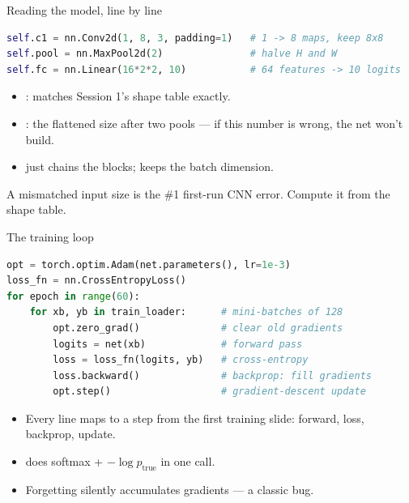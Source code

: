 \documentclass[10pt,aspectratio=169]{beamer}
\begin{document}
\begin{frame}[fragile]{Reading the model, line by line}
\begin{lstlisting}[language=Python]
self.c1 = nn.Conv2d(1, 8, 3, padding=1)   # 1 -> 8 maps, keep 8x8
self.pool = nn.MaxPool2d(2)               # halve H and W
self.fc = nn.Linear(16*2*2, 10)           # 64 features -> 10 logits
\end{lstlisting}
  \begin{itemize}
    \item {}: matches Session 1's shape table exactly.
    \item {}: the flattened size after two pools --- if this number is wrong, the net won't build.
    \item {} just chains the blocks;  keeps the batch dimension.
  \end{itemize}
  \begin{badbox}
    A mismatched  input size is the \#1 first-run CNN error. Compute it from the shape table.
  \end{badbox}
\end{frame}

\begin{frame}[fragile]{The training loop}
\begin{lstlisting}[language=Python]
opt = torch.optim.Adam(net.parameters(), lr=1e-3)
loss_fn = nn.CrossEntropyLoss()
for epoch in range(60):
    for xb, yb in train_loader:      # mini-batches of 128
        opt.zero_grad()              # clear old gradients
        logits = net(xb)             # forward pass
        loss = loss_fn(logits, yb)   # cross-entropy
        loss.backward()              # backprop: fill gradients
        opt.step()                   # gradient-descent update
\end{lstlisting}
  \begin{itemize}
    \item Every line maps to a step from the first training slide: forward, loss, backprop, update.
    \item {} does softmax + $-\log p_{\text{true}}$ in one call.
    \item Forgetting  silently accumulates gradients --- a classic bug.
  \end{itemize}
\end{frame}

\end{document}
